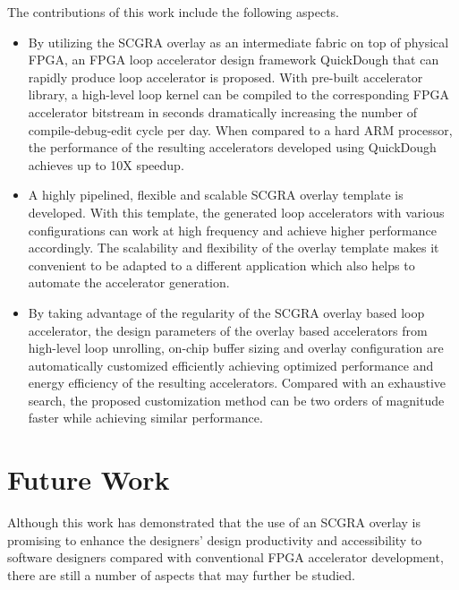 The contributions of this work include the following aspects.
\begin{itemize}

\item By utilizing the SCGRA overlay as an intermediate fabric on top of physical FPGA, an FPGA loop accelerator design framework QuickDough that can rapidly produce loop accelerator is proposed. With pre-built accelerator library, a high-level loop kernel can be compiled to the corresponding FPGA accelerator bitstream in seconds dramatically increasing the number of compile-debug-edit cycle per day. When compared to a hard ARM processor, the performance of the resulting accelerators developed using QuickDough achieves up to 10X speedup.

\item A highly pipelined, flexible and scalable SCGRA overlay template is developed. With this template, the generated loop accelerators with various configurations can work at high frequency and achieve higher performance accordingly. The scalability and flexibility of the overlay template makes it convenient to be adapted to a different application which also helps to automate the accelerator generation. 

\item By taking advantage of the regularity of the SCGRA overlay based loop accelerator, the design parameters of the overlay based accelerators from high-level loop unrolling, on-chip buffer sizing and overlay configuration are automatically customized efficiently achieving optimized performance and energy efficiency of the resulting accelerators. Compared with an exhaustive search, the proposed customization method can be two orders of magnitude faster while achieving similar performance.

\end{itemize}
  
\section{Future Work}
Although this work has demonstrated that the use of an SCGRA overlay is promising to enhance the designers' design productivity and accessibility to software designers compared with conventional FPGA accelerator development, there are still a number of aspects that may further be studied. 

